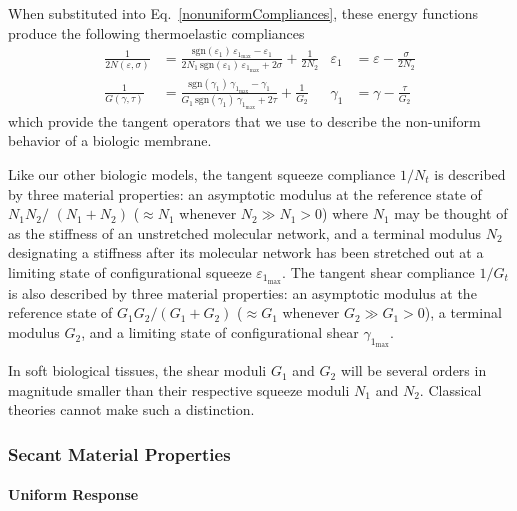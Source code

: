When substituted into Eq.~\ref{nonuniformCompliances}, these energy functions produce the following thermo\-elastic compliances
\begin{subequations}
    \label{nonuniformComplianceFns}
    \begin{align}
    \frac{1}{2N(\varepsilon , \sigma)} & = \frac{ \mathrm{sgn} (\varepsilon_1) \, \varepsilon_{1_{\max}} - \varepsilon_1}{2N_1 \, \mathrm{sgn} (\varepsilon_1) \, \varepsilon_{1_{\max}} + 2\sigma} + \frac{1}{2N_2} &
    \varepsilon_1 & = \varepsilon - \frac{\sigma}{2N_2}
    \label{squeezeCompliance2D} \\
    \frac{1}{G(\gamma , \tau)} & = \frac{ \mathrm{sgn} (\gamma_1) \, \gamma_{1_{\max}} - \gamma_1}{G_1 \, \mathrm{sgn} (\gamma_1) \, \gamma_{1_{\max}} + 2 \tau} + \frac{1}{G_2} & 
    \gamma_1 & = \gamma - \frac{\tau}{G_2}
    \label{shearCompliance2D}
    \end{align}
\end{subequations}
which provide the tangent operators that we use to describe the non-uniform behavior of a biologic membrane.

Like our other biologic models, the tangent squeeze compliance $1/N_t$ is described by three material properties: an asymptotic modulus at the reference state of $N_1 N_2 /$ $(N_1 + N_2)$ ($\approx N_1$ whenever $N_2 \gg N_1 > 0$) where $N_1$ may be thought of as the stiffness of an unstretched molecular network, and a terminal modulus $N_2$ designating a stiffness after its molecular network has been stretched out at a limiting state of configurational squeeze $\varepsilon_{1_{\max}}$.  The tangent shear compliance $1/G_t$ is also described by three material properties: an asymptotic modulus at the reference state of $G_1 G_2 / ( G_1 + G_2 )$ ($\approx G_1$ whenever $G_2 \gg G_1 > 0$), a terminal modulus $G_2$, and a limiting state of configurational shear $\gamma_{1_{\max}}$.  

In soft biological tissues, the shear moduli $G_1$ and $G_2$ will be several orders in magnitude smaller than their respective squeeze moduli $N_1$ and $N_2$.  Classical theories cannot make such a distinction.

\subsubsection{Secant Material Properties}

\paragraph{Uniform Response}

